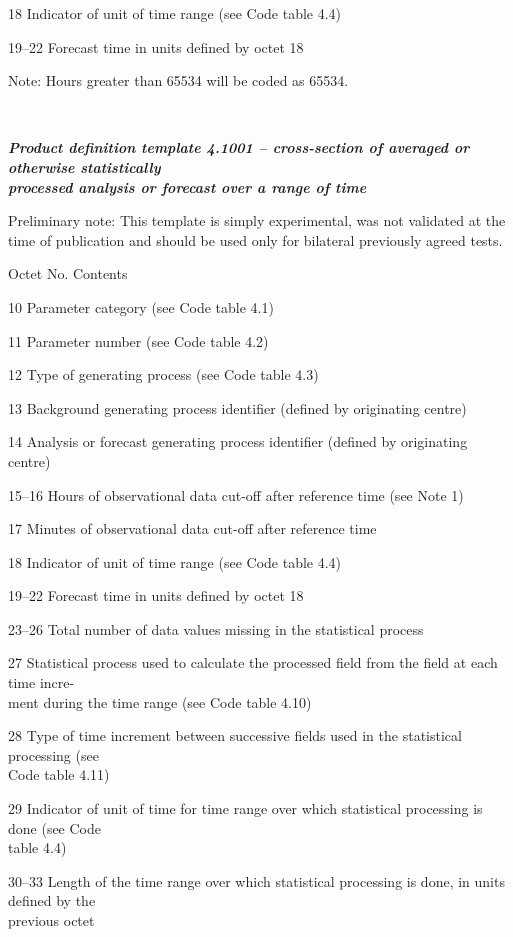 18 Indicator of unit of time range (see Code table 4.4)

19--22 Forecast time in units defined by octet 18

Note: Hours greater than 65534 will be coded as 65534.

\emph{\textbf{\\
}}

\emph{\textbf{Product definition template 4.1001 -- cross-section of averaged or otherwise statistically\\
processed analysis or forecast over a range of time}}

Preliminary note: This template is simply experimental, was not validated at the time of publication and should be used only for bilateral previously agreed tests.

Octet No. Contents

10 Parameter category (see Code table 4.1)

11 Parameter number (see Code table 4.2)

12 Type of generating process (see Code table 4.3)

13 Background generating process identifier (defined by originating centre)

14 Analysis or forecast generating process identifier (defined by originating centre)

15--16 Hours of observational data cut-off after reference time (see Note 1)

17 Minutes of observational data cut-off after reference time

18 Indicator of unit of time range (see Code table 4.4)

19--22 Forecast time in units defined by octet 18

23--26 Total number of data values missing in the statistical process

27 Statistical process used to calculate the processed field from the field at each time incre-\\
ment during the time range (see Code table 4.10)

28 Type of time increment between successive fields used in the statistical processing (see\\
Code table 4.11)

29 Indicator of unit of time for time range over which statistical processing is done (see Code\\
table 4.4)

30--33 Length of the time range over which statistical processing is done, in units defined by the\\
previous octet


